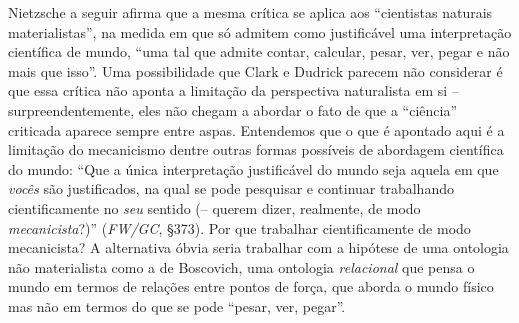 \documentclass[
	12pt,				%
	openright,			%
	oneside,			%
	a4paper,			%
	english,			%
	french,				%
	spanish,			%
	brazil				%
	]{abntex2}
\begin{document}
	Nietzsche a seguir afirma que a mesma crítica se aplica aos “cientistas naturais materialistas”, na medida em que só admitem como justificável uma interpretação científica de mundo, “uma tal que admite contar, calcular, pesar, ver, pegar e não mais que isso”. Uma possibilidade que Clark e Dudrick parecem não considerar é que essa crítica não aponta a limitação da perspectiva naturalista em si – surpreendentemente, eles não chegam a abordar o fato de que a “ciência” criticada aparece sempre entre aspas. Entendemos que o que é apontado aqui é a limitação do mecanicismo dentre outras formas possíveis de abordagem científica do mundo: “Que a única interpretação justificável do mundo seja aquela em que \textit{vocês} são justificados, na qual se pode pesquisar e continuar trabalhando cientificamente no \textit{seu} sentido (– querem dizer, realmente, de modo \textit{mecanicista}?)” (\textit{FW/GC}, §373). Por que trabalhar cientificamente de modo mecanicista? A alternativa óbvia seria trabalhar com a hipótese de uma ontologia não materialista como a de Boscovich, uma ontologia \textit{relacional} que pensa o mundo em termos de relações entre pontos de força, que aborda o mundo físico mas não em termos do que se pode “pesar, ver, pegar”. 
\end{document}
